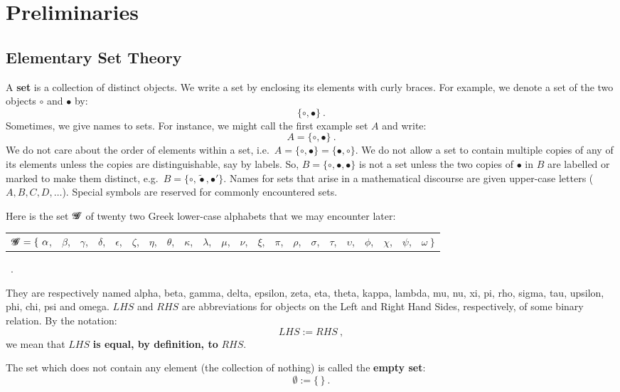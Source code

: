 \chapter{Preliminaries}\label{S:Preliminaries}
\section{Elementary Set Theory}\label{S:SetTheory}
A {\bf set} is a collection of distinct objects.  We write a set by enclosing its elements with curly braces.  For example, we denote a set of the two objects $\circ$ and $\bullet$ by:
\[
\boxed{
\{\circ, \bullet\}
} \ .
\]
Sometimes, we give names to sets.  For instance, we might call the first example set $A$ and write:
\[
\boxed{
A=\{\circ, \bullet\} }
\ .
\]
We do not care about the order of elements within a set, i.e.~$A=\{\circ, \bullet\}=\{\bullet,\circ\}$.  We do not allow a set to contain multiple copies of any of its elements unless the copies are distinguishable, say by labels.  So, $B=\{\circ, \bullet, \bullet\}$ is not a set unless the two copies of $\bullet$ in $B$ are labelled or marked to make them distinct, e.g.~$B=\{\circ,\tilde{\bullet},\bullet'\}$.  Names for sets that arise in a mathematical discourse are given upper-case letters ($A,B,C,D,\ldots$).  Special symbols are reserved for commonly encountered sets.

Here is the set ${\mathscr{G}}\mspace{-11 mu}{\mathscr{G}}$ of twenty two Greek lower-case alphabets that we may encounter later:

{\scriptsize
\begin{tabular}{llllllllllllllllllllll}
${\mathscr{G}}\mspace{-11 mu}{\mathscr{G}} = \{\ \alpha$,& $\beta$,& $\gamma$,& $\delta$,& $\epsilon$,& $\zeta$,& $\eta$,& $\theta$,& $\kappa$,& $\lambda$,& $\mu$,& $\nu$,& $\xi$,& $\pi$,& $\rho$,& $\sigma$,& $\tau$,& $\upsilon$,& $\phi$,& $\chi$,& $\psi$,& $\omega \ \} $
\end{tabular} \ .
}

They are respectively named alpha, beta, gamma, delta, epsilon, zeta, eta, theta, kappa, lambda, mu, nu, xi, pi, rho, sigma, tau, upsilon, phi, chi, psi and omega.  $LHS$ and $RHS$ are abbreviations for objects on the Left and Right Hand Sides, respectively, of some binary relation.  By the notation:
\[
\boxed{
LHS := RHS
} \ ,
\]
we mean that $LHS$ {\bf is equal, by definition, to} $RHS$.

The set which does not contain any element (the collection of nothing) is called the {\bf empty set}:
\[
\boxed{
\emptyset := \{ \, \}
} \ .
\]

